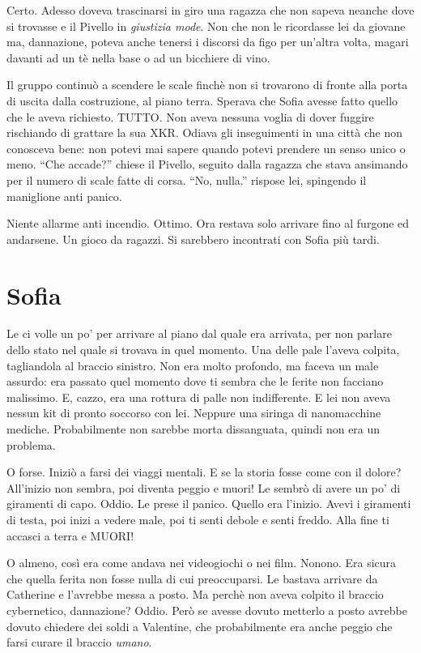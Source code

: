     Certo. Adesso doveva trascinarsi in giro una ragazza che non sapeva neanche dove si trovasse e il Pivello in
    \emph{giustizia mode}. Non che non le ricordasse lei da giovane ma, dannazione, poteva anche tenersi i discorsi da
    figo per un'altra volta, magari davanti ad un tè nella base o ad un bicchiere di vino.

    Il gruppo continuò a scendere le scale finchè non si trovarono di fronte alla porta di uscita dalla costruzione, al
    piano terra. Sperava che Sofia avesse fatto quello che le aveva richiesto. TUTTO. Non aveva nessuna voglia di dover
    fuggire rischiando di grattare la sua XKR. Odiava gli inseguimenti in una città che non conosceva bene: non potevi
    mai sapere quando potevi prendere un senso unico o meno. ``Che accade?'' chiese il Pivello, seguito dalla ragazza
    che stava ansimando per il numero di scale fatte di corsa. ``No, nulla.'' rispose lei, spingendo il maniglione anti
    panico.

    Niente allarme anti incendio. Ottimo. Ora restava solo arrivare fino al furgone ed andarsene. Un gioco da ragazzi.
    Si sarebbero incontrati con Sofia più tardi.

  \section*{Sofia}
    
    Le ci volle un po' per arrivare al piano dal quale era arrivata, per non parlare dello stato nel quale si trovava in
    quel momento. Una delle pale l'aveva colpita, tagliandola al braccio sinistro. Non era molto profondo, ma faceva un
    male assurdo: era passato quel momento dove ti sembra che le ferite non facciano malissimo. E, cazzo, era una
    rottura di palle non indifferente. E lei non aveva nessun kit di pronto soccorso con lei. Neppure una siringa di nanomacchine mediche.
    Probabilmente non sarebbe morta dissanguata, quindi non era un problema.

    O forse. Iniziò a farsi dei viaggi mentali. E se la storia fosse come con il dolore? All'inizio non sembra, poi
    diventa peggio e muori! Le sembrò di avere un po' di giramenti di capo. Oddio. Le prese il panico. Quello era
    l'inizio. Avevi i giramenti di testa, poi inizi a vedere male, poi ti senti debole e senti freddo. Alla fine ti
    accasci a terra e MUORI!

    O almeno, così era come andava nei videogiochi o nei film. Nonono. Era sicura che quella ferita non fosse nulla di
    cui preoccuparsi. Le bastava arrivare da Catherine e l'avrebbe messa a posto. Ma perchè non aveva colpito il braccio
    cybernetico, dannazione? Oddio. Però se avesse dovuto metterlo a posto avrebbe dovuto chiedere dei soldi a
    Valentine, che probabilmente era anche peggio che farsi curare il braccio \emph{umano}.


